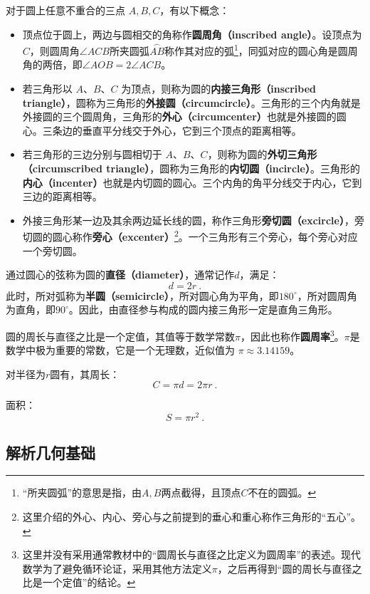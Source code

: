 对于圆上任意不重合的三点 $A,B,C$，有以下概念：
\begin{itemize}
\item 顶点位于圆上，两边与圆相交的角称作\textbf{圆周角（inscribed angle）}。设顶点为$C$，则圆周角$\angle ACB$所夹圆弧$\overset{\frown}{AB}$称作其对应的弧\footnote{“所夹圆弧”的意思是指，由$A,B$两点截得，且顶点$C$不在的圆弧。}，同弧对应的圆心角是圆周角的两倍，即$\angle AOB=2\angle ACB$。
\item 若三角形以 $A$、$B$、$C$ 为顶点，则称为圆的\textbf{内接三角形（inscribed triangle）}，圆称为三角形的\textbf{外接圆（circumcircle）}。三角形的三个内角就是外接圆的三个圆周角，三角形的\textbf{外心（circumcenter）}也就是外接圆的圆心。三条边的垂直平分线交于外心，它到三个顶点的距离相等。
\item 若三角形的三边分别与圆相切于 $A$、$B$、$C$，则称为圆的\textbf{外切三角形（circumscribed triangle）}，圆称为三角形的\textbf{内切圆（incircle）}。三角形的\textbf{内心（incenter）}也就是内切圆的圆心。三个内角的角平分线交于内心，它到三边的距离相等。
\item 外接三角形某一边及其余两边延长线的圆，称作三角形\textbf{旁切圆（excircle）}，旁切圆的圆心称作\textbf{旁心（excenter）}\footnote{这里介绍的外心、内心、旁心与之前提到的垂心和重心称作三角形的“五心”。}。一个三角形有三个旁心，每个旁心对应一个旁切圆。
\end{itemize}

通过圆心的弦称为圆的\textbf{直径（diameter）}，通常记作$d$，满足：
\begin{equation}
d = 2r~.
\end{equation}
此时，所对弧称为\textbf{半圆（semicircle）}，所对圆心角为平角，即$180^\circ$，所对圆周角为直角，即$90^\circ$。因此，由直径参与构成的圆内接三角形一定是直角三角形。

圆的周长与直径之比是一个定值，其值等于数学常数$\pi$，因此也称作\textbf{圆周率}\footnote{这里并没有采用通常教材中的“圆周长与直径之比定义为圆周率”的表述。现代数学为了避免循环论证，采用其他方法定义$\pi$，之后再得到“圆的周长与直径之比是一个定值”的结论。}。$\pi$是数学中极为重要的常数，它是一个无理数，近似值为 $\pi \approx 3.14159$。

对半径为$r$圆有，其周长：
\begin{equation}
C = \pi d=2 \pi r~. 
\end{equation}

面积：
\begin{equation}
S = \pi r^2~.
\end{equation}

\subsection{解析几何基础}

